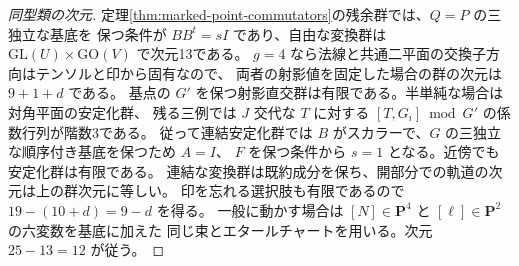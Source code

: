 \begin{proof}[同型類の次元]
定理\ref{thm:marked-point-commutators}の残余群では、$Q=P$ の三独立な基底を
保つ条件が $BB^t=sI$ であり、自由な変換群は
$\mathrm{GL}(U)\times\mathrm{GO}(V)$ で次元13である。
$g=4$ なら法線と共通二平面の交換子方向はテンソルと印から固有なので、
両者の射影値を固定した場合の群の次元は $9+1+d$ である。
基点の $G'$ を保つ射影直交群は有限である。半単純な場合は対角平面の安定化群、
残る三例では $J$ 交代な $T$ に対する $[T,G_i]\bmod G'$ の係数行列が階数3である。
従って連結安定化群では $B$ がスカラーで、$G$ の三独立な順序付き基底を保つため $A=I$、
$F$ を保つ条件から $s=1$ となる。近傍でも安定化群は有限である。
連結な変換群は既約成分を保ち、開部分での軌道の次元は上の群次元に等しい。
印を忘れる選択肢も有限であるので $19-(10+d)=9-d$ を得る。
一般に動かす場合は $[N]\in\mathbf P^4$ と $[\ell]\in\mathbf P^2$ の六変数を基底に加えた
同じ束とエタールチャートを用いる。次元 $25-13=12$ が従う。
\end{proof}
